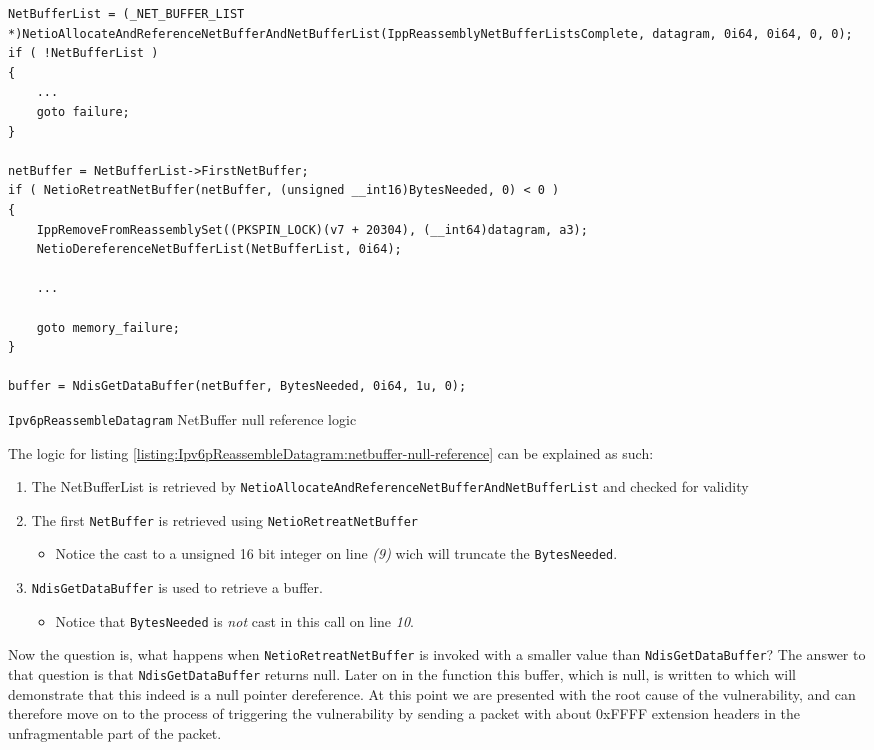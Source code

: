 \documentclass{report}
\begin{document}
\begin{listing}[H]
\begin{verbatim}
NetBufferList = (_NET_BUFFER_LIST *)NetioAllocateAndReferenceNetBufferAndNetBufferList(IppReassemblyNetBufferListsComplete, datagram, 0i64, 0i64, 0, 0);
if ( !NetBufferList )
{
    ...
    goto failure;
}

netBuffer = NetBufferList->FirstNetBuffer;
if ( NetioRetreatNetBuffer(netBuffer, (unsigned __int16)BytesNeeded, 0) < 0 )
{
    IppRemoveFromReassemblySet((PKSPIN_LOCK)(v7 + 20304), (__int64)datagram, a3);
    NetioDereferenceNetBufferList(NetBufferList, 0i64);

    ...

    goto memory_failure;
}

buffer = NdisGetDataBuffer(netBuffer, BytesNeeded, 0i64, 1u, 0);
\end{verbatim}
\caption{\texttt{Ipv6pReassembleDatagram} NetBuffer null reference logic}
\label{listing:Ipv6pReassembleDatagram:netbuffer-null-reference}
\end{listing}

The logic for listing \ref{listing:Ipv6pReassembleDatagram:netbuffer-null-reference} can be explained as such:
\begin{enumerate}
  \item The NetBufferList is retrieved by \texttt{NetioAllocateAndReferenceNetBufferAndNetBufferList} and checked for validity
  \item The first \texttt{NetBuffer} is retrieved using \texttt{NetioRetreatNetBuffer}
  \begin{itemize}
    \item Notice the cast to a unsigned 16 bit integer on line \emph{(9)} wich will truncate the \texttt{BytesNeeded}.
  \end{itemize}
  \item \texttt{NdisGetDataBuffer} is used to retrieve a buffer.
  \begin{itemize}
    \item Notice that \texttt{BytesNeeded} is \emph{not} cast in this call on line \emph{10}.
  \end{itemize}
\end{enumerate}

Now the question is, what happens when \texttt{NetioRetreatNetBuffer} is invoked with a smaller value than \texttt{NdisGetDataBuffer}? The answer to that question is that \texttt{NdisGetDataBuffer} returns null. Later on in the function this buffer, which is null, is written to which will demonstrate that this indeed is a null pointer dereference. At this point we are presented with the root cause of the vulnerability, and can therefore move on to the process of triggering the vulnerability by sending a packet with about 0xFFFF extension headers in the unfragmentable part of the packet.
\end{document}

